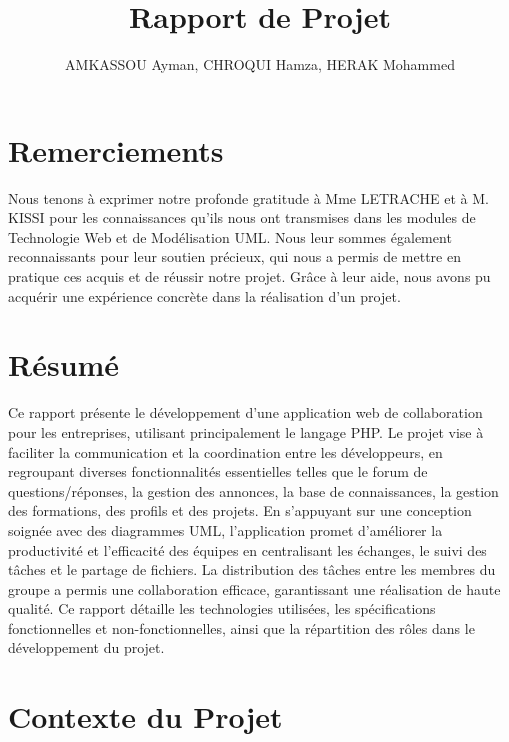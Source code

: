 \documentclass{article}
\title{Rapport de Projet}
\author{AMKASSOU Ayman, CHROQUI Hamza, HERAK Mohammed}
\begin{document}
    \setcounter{page}{2} 
    \tableofcontents
    \newpage

    \listoffigures

    \listoftables
    \newpage

    \section{Remerciements}
        Nous tenons à exprimer notre profonde gratitude à Mme LETRACHE et à M. KISSI pour les connaissances qu'ils nous ont transmises dans les modules de Technologie Web et de Modélisation UML. Nous leur sommes également reconnaissants pour leur soutien précieux, qui nous a permis de mettre en pratique ces acquis et de réussir notre projet. Grâce à leur aide, nous avons pu acquérir une expérience concrète dans la réalisation d'un projet.
    
    \newpage
    
    \section{Résumé}
        Ce rapport présente le développement d'une application web de collaboration pour les entreprises, utilisant principalement le langage PHP. 
        Le projet vise à faciliter la communication et la coordination entre les développeurs, en regroupant diverses fonctionnalités essentielles telles que le forum de questions/réponses, 
        la gestion des annonces, la base de connaissances, la gestion des formations, des profils et des projets. En s'appuyant sur une conception soignée avec des diagrammes UML, 
        l'application promet d'améliorer la productivité et l'efficacité des équipes en centralisant les échanges, le suivi des tâches et le partage de fichiers. 
        La distribution des tâches entre les membres du groupe a permis une collaboration efficace, garantissant une réalisation de haute qualité. 
        Ce rapport détaille les technologies utilisées, les spécifications fonctionnelles et non-fonctionnelles, ainsi que la répartition des rôles dans le développement du projet.
    \newpage
    
    \section{Contexte du Projet}
\end{document}
